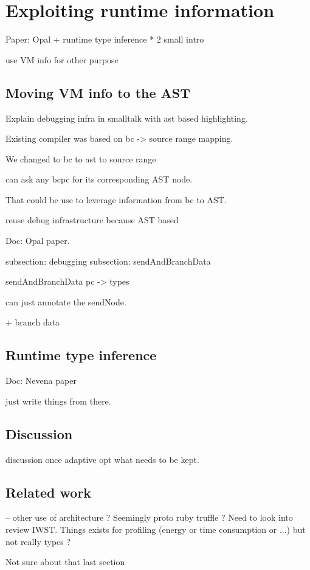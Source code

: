 \documentclass[a4paper,12pt,twoside]{../includes/ThesisStyle}
\begin{document}
\fi

\chapter{Exploiting runtime information}
\label{chap:exploitation}
\minitoc

Paper: Opal + runtime type inference * 2
small intro

use VM info for other purpose

\section{Moving VM info to the AST}

Explain debugging infra in smalltalk with ast based highlighting.

Existing compiler was based on bc -> source range mapping.

We changed to bc to ast to source range

can ask any bcpc for its corresponding AST node.

That could be use to leverage information from bc to AST.

reuse debug infrastructure because AST based

Doc: Opal paper.

subsection: debugging
subsection: sendAndBranchData 

sendAndBranchData pc -> types

can just annotate the sendNode.

+ branch data

\section{Runtime type inference}

Doc: Nevena paper

just write things from there.

\section{Discussion}

discussion once adaptive opt what needs to be kept.

\section{Related work}
-- other use of architecture ? Seemingly proto ruby truffle ? Need to look into review IWST. Things exists for profiling (energy or time consumption or ...) but not really types ?

Not sure about that last section

\ifx\wholebook\relax\else
    
\end{document}
